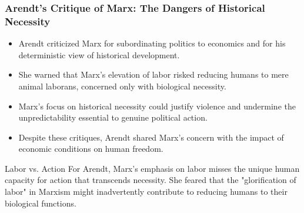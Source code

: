 \documentclass{beamer}
\begin{document}
\begin{frame}
\frametitle{Arendt's Critique of Marx: The Dangers of Historical Necessity}
\begin{itemize}
    \item Arendt criticized Marx for subordinating politics to economics and for his deterministic view of historical development.
    \item She warned that Marx's elevation of labor risked reducing humans to mere animal laborans, concerned only with biological necessity.
    \item Marx's focus on historical necessity could justify violence and undermine the unpredictability essential to genuine political action.
    \item Despite these critiques, Arendt shared Marx's concern with the impact of economic conditions on human freedom.
\end{itemize}

\begin{alertblock}{Labor vs. Action}
For Arendt, Marx's emphasis on labor misses the unique human capacity for action that transcends necessity. She feared that the "glorification of labor" in Marxism might inadvertently contribute to reducing humans to their biological functions.
\end{alertblock}
\end{frame}
\end{document}
